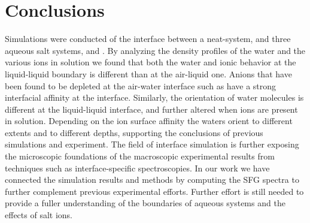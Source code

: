 \section{Conclusions}

Simulations were conducted of the interface between a neat-\wat system, and three aqueous salt systems, and \ctc. By analyzing the density profiles of the water and the various ions in solution we found that both the water and ionic behavior at the liquid-liquid boundary is different than at the air-liquid one. Anions that have been found to be depleted at the air-water interface such as \nit have a strong interfacial affinity at the \ctcwat interface. Similarly, the orientation of water molecules is different at the liquid-liquid interface, and further altered when ions are present in solution. Depending on the ion surface affinity the waters orient to different extents and to different depths, supporting the conclusions of previous simulations and experiment. The field of interface simulation is further exposing the microscopic foundations of the macroscopic experimental results from techniques such as interface-specific spectroscopies. In our work we have connected the simulation results and methods by computing the SFG spectra to further complement previous experimental efforts. Further effort is still needed to provide a fuller understanding of the boundaries of aqueous systems and the effects of salt ions.
